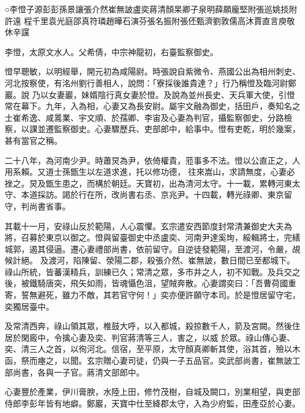 
\begin{pinyinscope}

 ○李憕子源彭彭孫景讓張介然崔無詖盧奕蔣清顏杲卿子泉明薛願龐堅附張巡姚掞附許遠
 程千里袁光庭邵真符璘趙曄石演芬張名振附張伾甄濟劉敦儒高沐賈直言庾敬休辛讜



 李憕，太原文水人。父希倩，中宗神龍初，右臺監察御史。



 憕早聰敏，以明經舉，開元初為咸陽尉。時張說自紫微令、燕國公出為相州刺史、河北按察使，有洺州劉行善相人，說問：「寮採後誰貴達？」行乃稱憕及臨河尉鄭巖。說
 乃以女妻巖，妹婿陰行真女妻於憕。及說為並州長史、天兵軍大使，引憕常在幕下。九年，入為相，心妻又為長安尉。屬宇文融為御史，括田戶，奏知名之士崔希逸、咸暠業、宇文順、於孺卿、李宙及心妻為判官，攝監察御史，分路檢察，以課並遷監察御史。心妻驟歷兵、吏部郎中，給事中。憕有吏乾，明於幾案，甚有當官之稱。



 二十八年，為河南少尹。時蕭炅為尹，依倚權貴，蒞事多不法。憕以公直正之，人用系賴。又道士孫甑生以左道求進，托以修功德，
 往來嵩山，求請無度，心妻必挫之。炅及甑生患之，而構於朝廷。天寶初，出為清河太守。十一載，累轉河東太守、本道採訪。謁於行在所，改尚書右丞、京兆尹。十四載，轉光祿卿、東京留守，判尚書省事。



 其載十一月，安祿山反於範陽，人心震懼。玄宗遣安西節度封常清兼御史大夫為將，召募於東京以御之。憕與留臺御史中丞盧奕、河南尹達奚珣，綏輯將士，完繕城郭，遏其侵逼。遷心妻禮部尚書，依前留守。自逆徒發範陽，至渡河，令嚴，覘候計絕。
 及渡河，陷陳留、滎陽二郡，殺張介然、崔無詖，數日間已至都城下。祿山所統，皆蕃漢精兵，訓練已久；常清之眾，多市井之人，初不知戰。及兵交之後，被鐵騎唐突，飛矢如雨，皆魂懾色沮，望賊奔散。心妻謂奕曰：「吾曹荷國重寄，誓無避死，雖力不敵，其若官守何！」奕亦便許願守本司。於是憕居留守宅，奕獨居臺中。



 及常清西奔，祿山領其眾，椎鼓大呼，以入都城，殺掠數千人，箭及宮闕。然後住居於閑廄中，令擒心妻及奕、判官蔣清等三人，害之，以威
 於眾。祿山傳心妻、奕、清三人之首，以徇河北。信宿，至平原，太守顏真卿斬其使，浴其首，殮以木函，祭而瘞之，以聞。玄宗贈心妻司徒，仍與一子五品官。奕武部尚書，崔無詖工部尚書，各與一子官。蔣清文部郎中。



 心妻豐於產業，伊川膏腴，水陸上田，修竹茂樹，自城及闕口，別業相望，與吏部侍郎李彭年皆有地癖。鄭巖，天寶中仕至絳郡太守，入為少府監，田產亞於心妻。




\end{pinyinscope}
